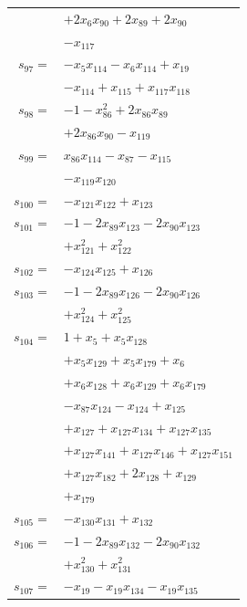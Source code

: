 \begin{longtable}{@{}r@{\;}l@{}}
 & \(\displaystyle +2x_{6}x_{90} +2x_{89} +2x_{90}\) \\
 & \(\displaystyle -x_{117}\) \\[3pt]
\(s_{97}=\) & \(\displaystyle -x_{5}x_{114} -x_{6}x_{114} +x_{19}\) \\
 & \(\displaystyle -x_{114} +x_{115} +x_{117}x_{118}\) \\[3pt]
\(s_{98}=\) & \(\displaystyle -1 -x_{86}^{2} +2x_{86}x_{89}\) \\
 & \(\displaystyle +2x_{86}x_{90} -x_{119}\) \\[3pt]
\(s_{99}=\) & \(\displaystyle x_{86}x_{114} -x_{87} -x_{115}\) \\
 & \(\displaystyle -x_{119}x_{120}\) \\[3pt]
\(s_{100}=\) & \(\displaystyle -x_{121}x_{122} +x_{123}\) \\[3pt]
\(s_{101}=\) & \(\displaystyle -1 -2x_{89}x_{123} -2x_{90}x_{123}\) \\
 & \(\displaystyle +x_{121}^{2} +x_{122}^{2}\) \\[3pt]
\(s_{102}=\) & \(\displaystyle -x_{124}x_{125} +x_{126}\) \\[3pt]
\(s_{103}=\) & \(\displaystyle -1 -2x_{89}x_{126} -2x_{90}x_{126}\) \\
 & \(\displaystyle +x_{124}^{2} +x_{125}^{2}\) \\[3pt]
\(s_{104}=\) & \(\displaystyle 1 +x_{5} +x_{5}x_{128}\) \\
 & \(\displaystyle +x_{5}x_{129} +x_{5}x_{179} +x_{6}\) \\
 & \(\displaystyle +x_{6}x_{128} +x_{6}x_{129} +x_{6}x_{179}\) \\
 & \(\displaystyle -x_{87}x_{124} -x_{124} +x_{125}\) \\
 & \(\displaystyle +x_{127} +x_{127}x_{134} +x_{127}x_{135}\) \\
 & \(\displaystyle +x_{127}x_{141} +x_{127}x_{146} +x_{127}x_{151}\) \\
 & \(\displaystyle +x_{127}x_{182} +2x_{128} +x_{129}\) \\
 & \(\displaystyle +x_{179}\) \\[3pt]
\(s_{105}=\) & \(\displaystyle -x_{130}x_{131} +x_{132}\) \\[3pt]
\(s_{106}=\) & \(\displaystyle -1 -2x_{89}x_{132} -2x_{90}x_{132}\) \\
 & \(\displaystyle +x_{130}^{2} +x_{131}^{2}\) \\[3pt]
\(s_{107}=\) & \(\displaystyle -x_{19} -x_{19}x_{134} -x_{19}x_{135}\) \\

\end{longtable}
